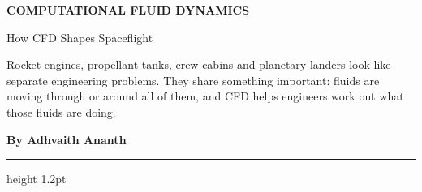 \documentclass[10pt,a4paper]{article}
\newcommand{\StandfirstText}{
Rocket engines, propellant tanks, crew cabins and planetary
landers look like separate engineering problems. They share
something important: fluids are moving through or around all
of them, and CFD helps engineers work out what those fluids
are doing.
}
\begin{document}
{
\sffamily
\bfseries
\fontsize{8}{10}\selectfont
\color{accent}
COMPUTATIONAL FLUID DYNAMICS
}
\par

\vspace{1mm}

{
\fontsize{30}{33}\selectfont
How CFD Shapes Spaceflight
}
\par

\vspace{1mm}

{
\sffamily
\fontsize{11}{14}\selectfont
\StandfirstText
}
\par

\vspace{1mm}

{
\sffamily
\bfseries
By Adhvaith Ananth
}
\par

\vspace{1mm}

{\color{accent}\hrule height 1.2pt}

\vspace{2mm}
\end{document}
